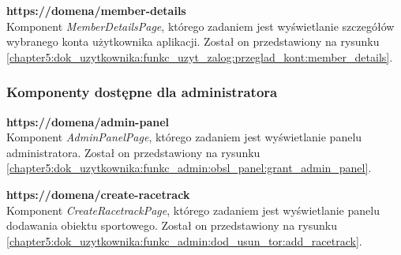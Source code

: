 \documentclass[../Kamil_Kowalewski_Main.tex]{subfiles}
\begin{document}
{{{{                \noindent\textbf{https://domena/member-details}\\
                \indent Komponent \textit{MemberDetailsPage}, którego zadaniem jest
                wyświetlanie szczegółów wybranego konta użytkownika aplikacji. Został
                on przedstawiony na rysunku
                \ref{chapter5:dok_uzytkownika:funkc_uzyt_zalog:przeglad_kont:member_details}.
            }

            \subsubsection{Komponenty dostępne dla administratora}
            \label{chapter4:dok_techniczna:implementacja:struktura_stron:admin} {

                \noindent\textbf{https://domena/admin-panel}\\
                \indent Komponent \textit{AdminPanelPage}, którego zadaniem jest
                wyświetlanie panelu administratora. Został on przedstawiony na rysunku
                \ref{chapter5:dok_uzytkownika:funkc_admin:obsl_panel:grant_admin_panel}.

                \noindent\textbf{https://domena/create-racetrack}\\
                \indent Komponent \textit{CreateRacetrackPage}, którego zadaniem jest
                wyświetlanie panelu dodawania obiektu sportowego. Został on przedstawiony
                na rysunku
                \ref{chapter5:dok_uzytkownika:funkc_admin:dod_usun_tor:add_racetrack}.
            }
        }

}}
\end{document}
